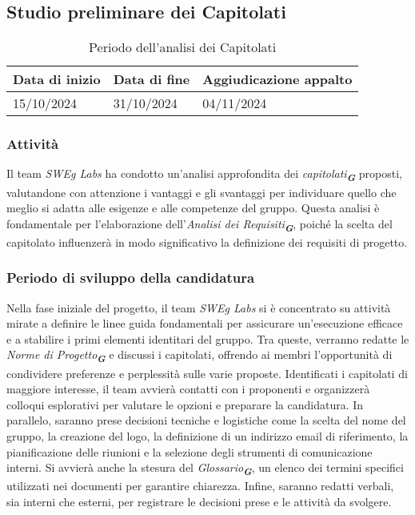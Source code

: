 \vspace{0.5cm}

\subsection{Studio preliminare dei Capitolati}
\begin{table}[h!]
    \centering
    \renewcommand{\arraystretch}{1.5} %
    \begin{tabularx}{\textwidth}{|X|X|X|}\hline
    \rowcolor[HTML]{FFD700} 
    \textbf{Data di inizio} & \textbf{Data di fine} & \textbf{Aggiudicazione appalto} \\ \hline
    15/10/2024 & 31/10/2024 & 04/11/2024 \\ \hline
    \end{tabularx}
    \caption{Periodo dell’analisi dei Capitolati}
\end{table}

\subsubsection{Attività}
Il team \emph{SWEg Labs} ha condotto un’analisi approfondita dei \emph{capitolati}\textsubscript{\textit{\textbf{G}}} proposti, valutandone con attenzione i vantaggi e gli svantaggi per individuare quello che meglio si adatta alle esigenze e alle competenze del gruppo. 
Questa analisi è fondamentale per l’elaborazione dell’\emph{Analisi dei Requisiti}\textsubscript{\textit{\textbf{G}}}, poiché la scelta del capitolato influenzerà in modo significativo la definizione dei requisiti di progetto.

\subsubsection{Periodo di sviluppo della candidatura}
Nella fase iniziale del progetto, il team \emph{SWEg Labs} si è concentrato su attività mirate a definire le linee guida fondamentali per assicurare un'esecuzione efficace e a stabilire i primi elementi identitari del gruppo.
Tra queste, verranno redatte le \emph{Norme di Progetto}\textsubscript{\textit{\textbf{G}}} e discussi i capitolati, offrendo ai membri l’opportunità di condividere preferenze e perplessità sulle varie proposte. Identificati i capitolati di maggiore interesse, il team avvierà contatti con i proponenti e organizzerà colloqui esplorativi per valutare le opzioni e preparare la candidatura.
In parallelo, saranno prese decisioni tecniche e logistiche come la scelta del nome del gruppo, la creazione del logo, la definizione di un indirizzo email di riferimento, la pianificazione delle riunioni e la selezione degli strumenti di comunicazione interni. Si avvierà anche la stesura del \emph{Glossario}\textsubscript{\textit{\textbf{G}}}, un elenco dei termini specifici utilizzati nei documenti per garantire chiarezza. Infine, saranno redatti verbali, sia interni che esterni, per registrare le decisioni prese e le attività da svolgere.
\newpage
